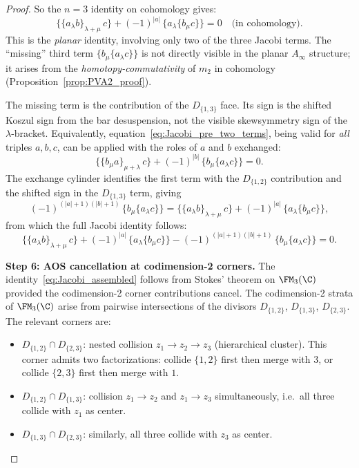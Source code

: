 \begin{proof}
So the $n=3$ identity on cohomology gives:
\begin{equation}
\{\{a_\lambda b\}_{\lambda+\mu}\, c\}
+ (-1)^{|a|}\, \{a_\lambda \{b_\mu c\}\}
= 0 \quad \text{(in cohomology)}.
\end{equation}
This is the \emph{planar} identity, involving only two of the three Jacobi terms.
The ``missing'' third term $\{b_\mu \{a_\lambda c\}\}$ is not directly visible in the planar $A_\infty$ structure; it arises from the \emph{homotopy-commutativity} of $m_2$ in cohomology (Proposition~\ref{prop:PVA2_proof}).

The missing term is the contribution of the $D_{\{1,3\}}$ face.
Its sign is the shifted Koszul sign from the bar desuspension, not
the visible skewsymmetry sign of the $\lambda$-bracket. Equivalently,
equation~\eqref{eq:Jacobi_pre_two_terms}, being valid for
\emph{all} triples $a,b,c$, can be applied with the roles of $a$ and
$b$ exchanged:
\[
\{\{b_\mu a\}_{\mu+\lambda}\, c\}
+ (-1)^{|b|}\, \{b_\mu \{a_\lambda c\}\}
= 0.
\]
The exchange cylinder identifies the first term with the
$D_{\{1,2\}}$ contribution and the shifted sign in the
$D_{\{1,3\}}$ term, giving
\[
(-1)^{(|a|+1)(|b|+1)}\, \{b_\mu\{a_\lambda c\}\}
= \{\{a_\lambda b\}_{\lambda+\mu}\, c\}
+ (-1)^{|a|}\, \{a_\lambda\{b_\mu c\}\},
\]
from which the full Jacobi identity follows:
\begin{equation}
\{\{a_\lambda b\}_{\lambda+\mu}\, c\}
+ (-1)^{|a|}\, \{a_\lambda \{b_\mu c\}\}
- (-1)^{(|a|+1)(|b|+1)}\, \{b_\mu \{a_\lambda c\}\}
= 0.
\end{equation}

\medskip
\textbf{Step 6: AOS cancellation at codimension-2 corners.}
The identity~\eqref{eq:Jacobi_assembled} follows from Stokes' theorem on $\FM_3(\C)$ provided the codimension-2 corner contributions cancel. The codimension-2 strata of $\FM_3(\C)$ arise from pairwise intersections of the divisors $D_{\{1,2\}}$, $D_{\{1,3\}}$, $D_{\{2,3\}}$. The relevant corners are:
\begin{itemize}
\item $D_{\{1,2\}} \cap D_{\{2,3\}}$: nested collision $z_1 \to z_2 \to z_3$ (hierarchical cluster). This corner admits two factorizations: collide $\{1,2\}$ first then merge with $3$, or collide $\{2,3\}$ first then merge with $1$.
\item $D_{\{1,2\}} \cap D_{\{1,3\}}$: collision $z_1 \to z_2$ and $z_1 \to z_3$ simultaneously, i.e.\ all three collide with $z_1$ as center.
\item $D_{\{1,3\}} \cap D_{\{2,3\}}$: similarly, all three collide with $z_3$ as center.
\end{itemize}


\end{proof}
